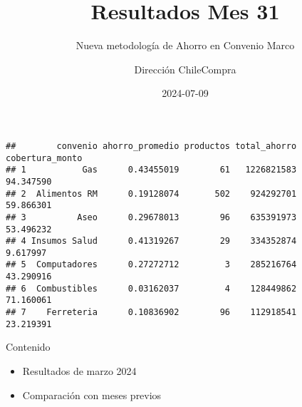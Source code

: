 \documentclass[
  ignorenonframetext,
]{beamer}
\title{Resultados Mes 31}
\subtitle{Nueva metodología de Ahorro en Convenio Marco}
\author{Dirección ChileCompra}
\date{2024-07-09}
\providecommand{\tightlist}{%
  \setlength{\itemsep}{0pt}\setlength{\parskip}{0pt}}
\begin{document}
\frame{\titlepage}

\begin{frame}[fragile]
\begin{verbatim}
##        convenio ahorro_promedio productos total_ahorro cobertura_monto
## 1           Gas      0.43455019        61   1226821583       94.347590
## 2  Alimentos RM      0.19128074       502    924292701       59.866301
## 3          Aseo      0.29678013        96    635391973       53.496232
## 4 Insumos Salud      0.41319267        29    334352874        9.617997
## 5  Computadores      0.27272712         3    285216764       43.290916
## 6  Combustibles      0.03162037         4    128449862       71.160061
## 7    Ferreteria      0.10836902        96    112918541       23.219391
\end{verbatim}
\end{frame}

\begin{frame}{Contenido}
\protect\hypertarget{contenido}{}
\begin{itemize}
\tightlist
\item
  Resultados de marzo 2024
\end{itemize}

\vspace{0.25cm}

\begin{itemize}
\tightlist
\item
  Comparación con meses previos
\end{itemize}
\end{frame}
\end{document}
